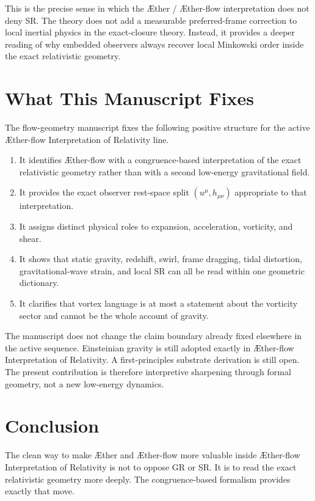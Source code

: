 \documentclass[11pt]{article}
\newcommand{\Aether}{\AE{}ther}
\newcommand{\Aflow}{\AE{}ther-flow}
\newcommand{\TheoryName}{\Aflow{} Interpretation of Relativity}
\begin{document}
This is the precise sense in which the \Aether{} / \Aflow{} interpretation does not deny SR. The theory does not add a measurable preferred-frame correction to local inertial physics in the exact-closure theory. Instead, it provides a deeper reading of why embedded observers always recover local Minkowski order inside the exact relativistic geometry.

\section{What This Manuscript Fixes}

The flow-geometry manuscript fixes the following positive structure for the active \TheoryName{} line.
\begin{enumerate}
    \item It identifies \Aflow{} with a congruence-based interpretation of the exact relativistic geometry rather than with a second low-energy gravitational field.
    \item It provides the exact observer rest-space split \((u^\mu,h_{\mu\nu})\) appropriate to that interpretation.
    \item It assigns distinct physical roles to expansion, acceleration, vorticity, and shear.
    \item It shows that static gravity, redshift, swirl, frame dragging, tidal distortion, gravitational-wave strain, and local SR can all be read within one geometric dictionary.
    \item It clarifies that vortex language is at most a statement about the vorticity sector and cannot be the whole account of gravity.
\end{enumerate}

The manuscript does not change the claim boundary already fixed elsewhere in the active sequence. Einsteinian gravity is still adopted exactly in \TheoryName{}. A first-principles substrate derivation is still open. The present contribution is therefore interpretive sharpening through formal geometry, not a new low-energy dynamics.

\section{Conclusion}

The clean way to make \Aether{} and \Aflow{} more valuable inside \TheoryName{} is not to oppose GR or SR. It is to read the exact relativistic geometry more deeply. The congruence-based formalism provides exactly that move.
\end{document}
